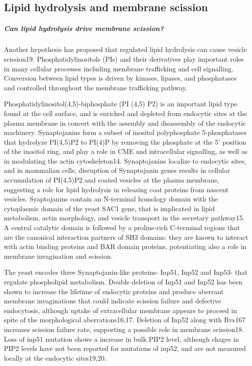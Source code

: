 	\subsection{Lipid hydrolysis and membrane scission}
	
	\subparagraph{Can lipid hydrolysis drive membrane scission?}
	Another hypothesis has proposed that regulated lipid hydrolysis can cause vesicle scission19. Phosphatidylinositols (PIs) and their derivatives play important roles in many cellular processes including membrane trafficking and cell signalling. Conversion between lipid types is driven by kinases, lipases, and phosphatases and controlled throughout the membrane trafficking pathway. 
	
	\vspace{5mm}
	Phosphatidylinositol(4,5)-biphosphate (PI (4,5) P2) is an important lipid type found at the cell surface, and is enriched and depleted from endocytic sites at the plasma membrane in concert with the assembly and disassembly of the endocytic machinery. Synaptojanins form a subset of inositol polyphosphate 5-phosphatases that hydrolyze PI(4,5)P2 to PI(4)P by removing the phosphate at the 5’ position of the inositol ring, and play a role in CME and intracellular signalling, as well as in modulating the actin cytoskeleton14. Synaptojanins localize to endocytic sites, and in mammalian cells, disruption of Synaptojanin genes results in cellular accumulation of PI(4,5)P2 and coated vesicles at the plasma membrane, suggesting a role for lipid hydrolysis in releasing coat proteins from nascent vesicles. Syaptojanins contain an N-terminal homology domain with the cytoplasmic domain of the yeast SAC1 gene, that is implicated in lipid metabolism, actin morphology, and vesicle transport in the secretary pathway15. A central catalytic domain is followed by a proline-rich C-terminal regions that are the canonical interaction partners of SH3 domains: they are known to interact with actin binding proteins and BAR domain proteins, potentiating also a role in membrane invagination and scission. 
		
	\vspace{5mm}
	The yeast encodes three Synaptojanin-like proteins- Inp51, Inp52 and Inp53- that regulate phospholipid metabolism. Double deletion of Inp51 and Inp52 has been shown to increase the lifetime of endocytic proteins and produce aberrant membrane invaginations that could indicate scission failure and defective endocytosis, although uptake of extracellular membrane appears to proceed in spite of the morphological aberrations16,17. Deletion of Inp52 along with Rvs167 increases scission failure rate, supporting a possible role in membrane scission18. Loss of inp51 mutation shows a increase in bulk PIP2 level, although chages in PIP2 levels have not been reported for mutations of inp52, and are not measured locally at the endocytic sites19,20.

